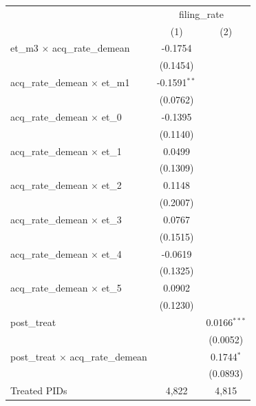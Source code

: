 
\begingroup
\centering
\begin{tabular}{lcc}
   \toprule
    & \multicolumn{2}{c}{filing\_rate}\\
                                              & (1)            & (2)\\  
   \midrule 
   et\_m3 $\times$ acq\_rate\_demean          & -0.1754        &   \\   
                                              & (0.1454)       &   \\   
   acq\_rate\_demean $\times$ et\_m1          & -0.1591$^{**}$ &   \\   
                                              & (0.0762)       &   \\   
   acq\_rate\_demean $\times$ et\_0           & -0.1395        &   \\   
                                              & (0.1140)       &   \\   
   acq\_rate\_demean $\times$ et\_1           & 0.0499         &   \\   
                                              & (0.1309)       &   \\   
   acq\_rate\_demean $\times$ et\_2           & 0.1148         &   \\   
                                              & (0.2007)       &   \\   
   acq\_rate\_demean $\times$ et\_3           & 0.0767         &   \\   
                                              & (0.1515)       &   \\   
   acq\_rate\_demean $\times$ et\_4           & -0.0619        &   \\   
                                              & (0.1325)       &   \\   
   acq\_rate\_demean $\times$ et\_5           & 0.0902         &   \\   
                                              & (0.1230)       &   \\   
   post\_treat                                &                & 0.0166$^{***}$\\   
                                              &                & (0.0052)\\   
   post\_treat $\times$ acq\_rate\_demean     &                & 0.1744$^{*}$\\   
                                              &                & (0.0893)\\   
   Treated PIDs                               & 4,822          & 4,815\\  

\end{tabular}
